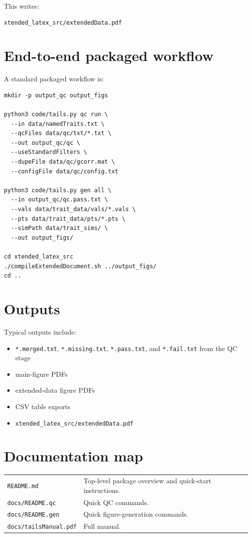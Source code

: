 \documentclass[11pt]{article}
\begin{document}
This writes:

\begin{verbatim}
xtended_latex_src/extendedData.pdf
\end{verbatim}

\section{End-to-end packaged workflow}

A standard packaged workflow is:

\begin{verbatim}
mkdir -p output_qc output_figs

python3 code/tails.py qc run \
  --in data/namedTraits.txt \
  --qcFiles data/qc/txt/*.txt \
  --out output_qc/qc \
  --useStandardFilters \
  --dupeFile data/qc/gcorr.mat \
  --configFile data/qc/config.txt

python3 code/tails.py gen all \
  --in output_qc/qc.pass.txt \
  --vals data/trait_data/vals/*.vals \
  --pts data/trait_data/pts/*.pts \
  --simPath data/trait_sims/ \
  --out output_figs/

cd xtended_latex_src
./compileExtendedDocument.sh ../output_figs/
cd ..
\end{verbatim}

\section{Outputs}

Typical outputs include:

\begin{itemize}[nosep]
\item \texttt{*.merged.txt}, \texttt{*.missing.txt}, \texttt{*.pass.txt}, and \texttt{*.fail.txt} from the QC stage
\item main-figure PDFs
\item extended-data figure PDFs
\item CSV table exports
\item \texttt{xtended\_latex\_src/extendedData.pdf}
\end{itemize}

\section{Documentation map}

\begin{longtable}{p{4cm}p{10cm}}
\texttt{README.md} & Top-level package overview and quick-start instructions. \\
\texttt{docs/README.qc} & Quick QC commands. \\
\texttt{docs/README.gen} & Quick figure-generation commands. \\
\texttt{docs/tailsManual.pdf} & Full manual. \\
\end{longtable}
\end{document}
